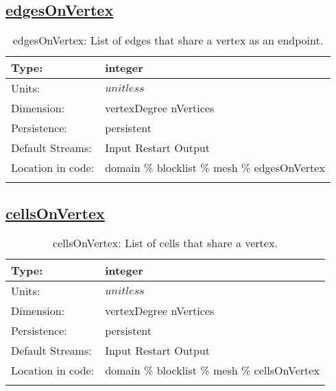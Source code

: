 \subsection[edgesOnVertex]{\hyperref[sec:var_tab_mesh]{edgesOnVertex}}
\label{subsec:var_sec_mesh_edgesOnVertex}
\begin{center}
\begin{longtable}{| p{2.0in} | p{4.0in} |}
        \hline 
        Type: & integer \\
        \hline 
        Units: & $unitless$ \\
        \hline 
        Dimension: & vertexDegree nVertices \\
        \hline 
        Persistence: & persistent \\
        \hline 
		 Default Streams: & Input Restart Output  \\
        \hline 
		 Location in code: & domain \% blocklist \% mesh \% edgesOnVertex \\
		 \hline 
    \caption{edgesOnVertex: List of edges that share a vertex as an endpoint.}
\end{longtable}
\end{center}
\subsection[cellsOnVertex]{\hyperref[sec:var_tab_mesh]{cellsOnVertex}}
\label{subsec:var_sec_mesh_cellsOnVertex}
\begin{center}
\begin{longtable}{| p{2.0in} | p{4.0in} |}
        \hline 
        Type: & integer \\
        \hline 
        Units: & $unitless$ \\
        \hline 
        Dimension: & vertexDegree nVertices \\
        \hline 
        Persistence: & persistent \\
        \hline 
		 Default Streams: & Input Restart Output  \\
        \hline 
		 Location in code: & domain \% blocklist \% mesh \% cellsOnVertex \\
		 \hline 
    \caption{cellsOnVertex: List of cells that share a vertex.}
\end{longtable}
\end{center}

